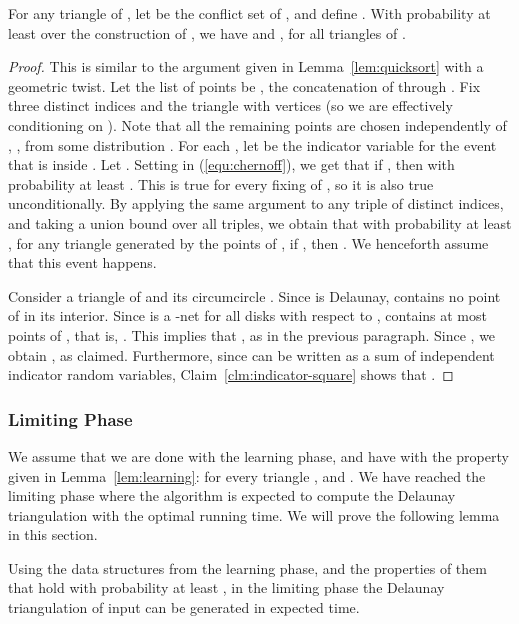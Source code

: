 \documentclass{siamltex}
\begin{document}
\begin{lemma} \label{lem:learning} 
For any triangle  of ,
let  be the conflict set of , 
and define .
With probability at least  over
the construction of ,
we have
 and , for all triangles  of .
\end{lemma}

\begin{proof} This is similar to the argument
given in Lemma~\ref{lem:quicksort} with a geometric twist.
Let the list of points 
be , the concatenation of  through 
.
Fix three distinct indices  and 
the triangle  with vertices
 (so we are effectively conditioning on ). Note
that all the remaining  points are chosen independently
of , , from some distribution . For
each , let 
 be the indicator variable
for the event that  is inside . Let 
.
Setting  in (\ref{equ:chernoff}),
we get that
if ,
then 
with probability at least .
This is true for every fixing of , so
it is also true unconditionally.
By applying the same argument to any triple  of
distinct indices, and taking a union bound over all
 triples,
we obtain that
with probability at least , for any triangle
 generated by the points of , if 
,
then . We henceforth assume that this
event happens.

Consider a triangle  of  and its circumcircle .
Since  is Delaunay,  contains no point of 
in its interior. Since  is a -net for all disks with
respect to ,  contains at most  points
of , that is, .
This implies that , as in the previous paragraph.
Since , we obtain ,
as claimed. Furthermore, since  can be written as a sum of independent 
indicator random variables, Claim~\ref{clm:indicator-square}
shows that . 
\end{proof}

\subsubsection{Limiting Phase} \label{sec:lim}

We assume that we are done with the learning phase, and have 
with the property given in Lemma~\ref{lem:learning}: for
every triangle ,  and . We have reached
the limiting phase where the algorithm is expected
to compute the Delaunay triangulation with the optimal running
time. We will prove the following lemma in this section.
\medskip

\begin{lemma} \label{lem:time} 
Using the data structures from
the learning phase, and the properties of them that hold
with probability at least , in the limiting phase the 
Delaunay triangulation
of input  can be generated in expected  time.
\end{lemma}
\end{document}
